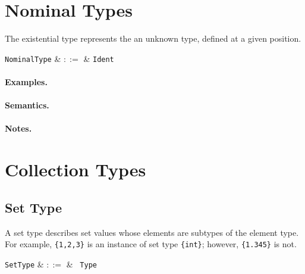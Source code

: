 
\section{Nominal Types}

The existential type represents the an unknown type, defined at a given position.

\begin{syntax}
  \verb+NominalType+ & $::=$ & \verb+Ident+\\
\end{syntax}

\paragraph{Examples.}

\paragraph{Semantics.}

\paragraph{Notes.}


\section{Collection Types}


\subsection{Set Type}

A set type describes set values whose elements are subtypes of the element type. For example, \lstinline|{1,2,3}| is an instance of set type \lstinline|{int}|; however, \lstinline|{1.345}| is not.

\begin{syntax}
  \verb+SetType+ & $::=$ & \token{\{} \ \verb+Type+ \ \token{\}} \\
\end{syntax}

